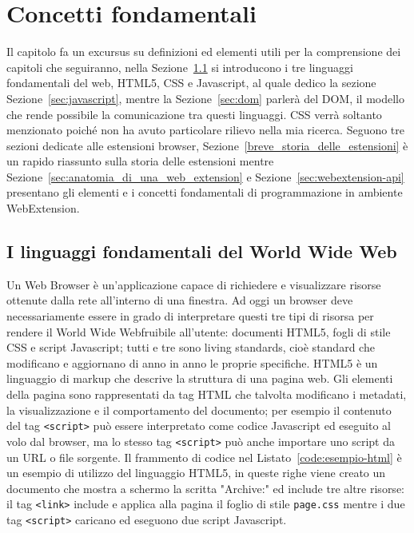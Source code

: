 \documentclass{sapthesis}
\newcommand{\code}[1]{\texttt{#1}}
\newcommand{\refSection}[1]{Sezione~\ref{#1}}
\newcommand{\Sezione}[1]{Sezione~\ref{#1}}
\newcommand{\www}{World Wide Web}
\newcommand{\tagHTML}[1]{\code{<#1>}}
\newcommand{\script}{\tagHTML{script}}
\begin{document}
\chapter{Concetti fondamentali}
\label{cap:concetti-fondamentali}
    Il capitolo fa un excursus su definizioni ed elementi utili per la comprensione dei capitoli che seguiranno,
    nella \Sezione{sec:I-linguaggi-fondamentali-del-www} si introducono i tre linguaggi fondamentali del web, HTML5,
    CSS e Javascript, al quale dedico la sezione \Sezione{sec:javascript}, mentre la \refSection{sec:dom} parlerà del DOM,
    il modello che rende possibile la comunicazione tra questi linguaggi. CSS verrà soltanto menzionato poiché non ha
    avuto particolare rilievo nella mia ricerca. Seguono tre sezioni dedicate alle estensioni browser, \Sezione{breve_storia_delle_estensioni}
    è un rapido riassunto sulla storia delle estensioni
    mentre \Sezione{sec:anatomia_di_una_web_extension} e \refSection{sec:webextension-api} presentano gli elementi e
    i concetti fondamentali di programmazione in ambiente WebExtension.


    \section{I linguaggi fondamentali del \www{}}
    \label{sec:I-linguaggi-fondamentali-del-www}
        Un Web Browser è un'applicazione capace di richiedere e visualizzare risorse ottenute dalla rete
        all'interno di una finestra.
        Ad oggi un browser deve necessariamente essere in grado di interpretare questi tre tipi di risorsa 
        per rendere il \www fruibile all'utente: documenti HTML5, fogli di stile CSS e script Javascript;
        tutti e tre sono living standards, cioè standard che modificano e aggiornano di anno in anno le
        proprie specifiche.
        HTML5 è un linguaggio di markup che descrive la struttura di una pagina web. Gli elementi della 
        pagina sono rappresentati da tag HTML che talvolta modificano i metadati, la visualizzazione e 
        il comportamento del documento; per esempio il contenuto del tag \script{} può essere interpretato 
        come codice Javascript ed eseguito al volo dal browser, ma lo stesso tag \script{} può anche importare
        uno script da un URL o file sorgente.
        Il frammento di codice nel Listato~\ref{code:esempio-html} è un esempio di utilizzo del linguaggio HTML5, in queste
        righe viene creato un documento che mostra a schermo la scritta "Archive:" ed include tre altre risorse:
        il tag \code{<link>} include e applica alla pagina il foglio di stile \code{page.css} mentre i due tag
        \script{} caricano ed eseguono due script Javascript.
\end{document}
